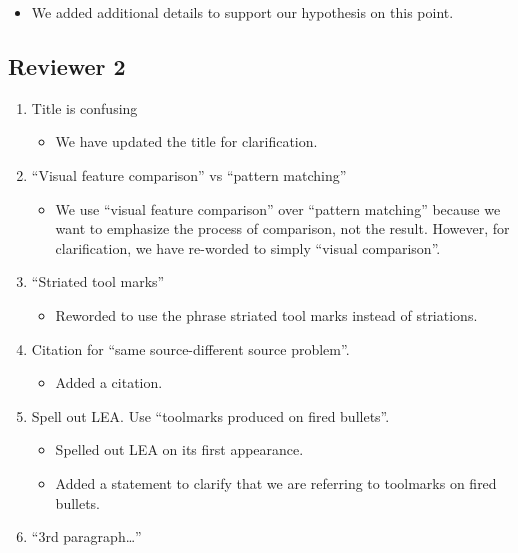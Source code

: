 \documentclass[12pt]{article}
\providecommand{\tightlist}{%
  \setlength{\itemsep}{0pt}\setlength{\parskip}{0pt}}
\begin{document}
\begin{enumerate}
  \begin{itemize}
  \tightlist
  \item
    We added additional details to support our hypothesis on this point.
  \end{itemize}
\end{enumerate}

\subsection{Reviewer 2}

\begin{enumerate}
\def\labelenumi{\arabic{enumi}.}
\item
  Title is confusing

  \begin{itemize}
  \tightlist
  \item
    We have updated the title for clarification.
  \end{itemize}
\item
  ``Visual feature comparison'' vs ``pattern matching''

  \begin{itemize}
  \tightlist
  \item
    We use ``visual feature comparison'' over ``pattern matching''
    because we want to emphasize the process of comparison, not the
    result. However, for clarification, we have re-worded to simply
    ``visual comparison''.
  \end{itemize}
\item
  ``Striated tool marks''

  \begin{itemize}
  \tightlist
  \item
    Reworded to use the phrase striated tool marks instead of
    striations.
  \end{itemize}
\item
  Citation for ``same source-different source problem''.

  \begin{itemize}
  \tightlist
  \item
    Added a citation.
  \end{itemize}
\item
  Spell out LEA. Use ``toolmarks produced on fired bullets''.

  \begin{itemize}
  \tightlist
  \item
    Spelled out LEA on its first appearance.
  \item
    Added a statement to clarify that we are referring to toolmarks on
    fired bullets.
  \end{itemize}
\item
  ``3rd paragraph\ldots{}''


\end{enumerate}
\end{document}
